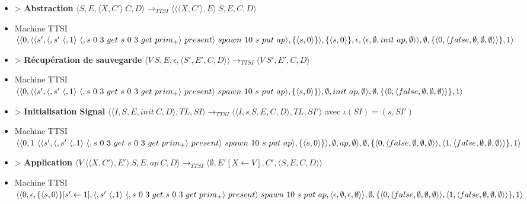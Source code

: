 \documentclass[10pt,a4paper]{article}
\begin{document}
\begin{itemize}
					\item[] > \textbf{Abstraction} $\langle S,E,\langle X,C'\rangle~C,D\rangle
					\longrightarrow_{TTSI} 
					\langle \langle\langle X,C'\rangle,E\rangle~S,E,C,D\rangle$
					\item[] Machine TTSI $\langle\langle 0,\langle\langle s', \langle, s'~\langle,1\rangle~\langle,s~0~3~get~s~0~3~get~prim_{+}\rangle~present\rangle~spawn~10~s~put~ap\rangle,\{\langle s,0\rangle\}\rangle,\{\langle s,0\rangle\},\epsilon,\\\langle\epsilon,\emptyset,init~ap,\emptyset\rangle\rangle,\emptyset,\{\langle 0,\langle false,\emptyset,\emptyset,\emptyset\rangle\rangle\},1\rangle$
					\item[] > \textbf{Récupération de sauvegarde} $\langle V~S,E,\epsilon,\langle S',E',C,D\rangle\rangle
					\longrightarrow_{TTSI} 
					\langle V~S',E',C,D\rangle$
					\item[] Machine TTSI $\langle\langle 0,\langle\langle s', \langle, s'~\langle,1\rangle~\langle,s~0~3~get~s~0~3~get~prim_{+}\rangle~present\rangle~spawn~10~s~put~ap\rangle,\{\langle s,0\rangle\}\rangle,\emptyset,init~ap,\emptyset\rangle\\,\emptyset,\{\langle 0,\langle false,\emptyset,\emptyset,\emptyset\rangle\rangle\},1\rangle$
					\item[] > \textbf{Initialisation Signal} $\langle\langle I,S,E,init~C,D\rangle,TL,SI\rangle 
					\longrightarrow_{TTSI}
					\langle\langle I,s~S,E,C,D\rangle,TL,SI'\rangle$
					avec $\iota(SI) = (s,SI')$
					\item[] Machine TTSI $\langle\langle 0, 1~\langle\langle s', \langle, s'~\langle,1\rangle~\langle,s~0~3~get~s~0~3~get~prim_{+}\rangle~present\rangle~spawn~10~s~put~ap\rangle,\{\langle s,0\rangle\}\rangle,\emptyset,ap,\emptyset\rangle\\,\emptyset,\{\langle 0,\langle false,\emptyset,\emptyset,\emptyset\rangle\rangle,\langle 1,\langle false,\emptyset,\emptyset,\emptyset\rangle\rangle\},1\rangle$
					\item[] > \textbf{Application} $\langle V~\langle\langle X,C'\rangle,E'\rangle~S,E,ap~C,D\rangle
					\longrightarrow_{TTSI} 
					\langle \emptyset,E'[X \leftarrow V],C',\langle S,E,C,D\rangle\rangle$
					\item[] Machine TTSI $\langle\langle 0, \epsilon ,\{\langle s,0\rangle\}[s' \leftarrow 1],\langle, s'~\langle,1\rangle~\langle,s~0~3~get~s~0~3~get~prim_{+}\rangle~present\rangle~spawn~10~s~put~ap,\langle\epsilon,\emptyset,\epsilon,\emptyset\rangle\rangle\\,\emptyset,\{\langle 0,\langle false,\emptyset,\emptyset,\emptyset\rangle\rangle,\langle 1,\langle false,\emptyset,\emptyset,\emptyset\rangle\rangle\},1\rangle$

\end{itemize}
\end{document}
